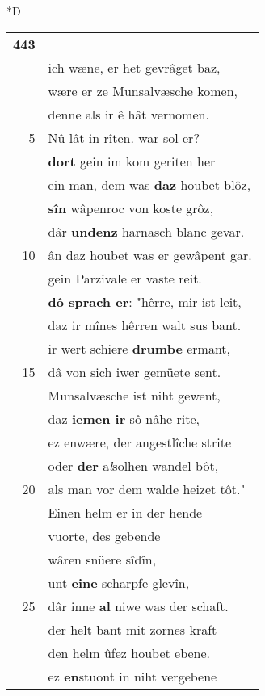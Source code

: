 \documentclass[8pt,a4paper,notitlepage]{article}
\begin{document}
\begin{table}[ht]
\begin{minipage}[t]{0.5\linewidth}
\small
\begin{center}*D
\end{center}
\begin{tabular}{rl}
\textbf{443} & \textit{\begin{large}A\end{large}}l sîner vröude er dô vergaz.\\ 
 & ich wæne, er het gevrâget baz,\\ 
 & wære er ze Munsalvæsche komen,\\ 
 & denne als ir ê hât vernomen.\\ 
5 & Nû lât in rîten. war sol er?\\ 
 & \textbf{dort} gein im kom geriten her\\ 
 & ein man, dem was \textbf{daz} houbet blôz,\\ 
 & \textbf{sîn} wâpenroc von koste grôz,\\ 
 & dâr \textbf{undenz} harnasch blanc gevar.\\ 
10 & ân daz houbet was er gewâpent gar.\\ 
 & gein Parzivale er vaste reit.\\ 
 & \textbf{dô sprach er}: "hêrre, mir ist leit,\\ 
 & daz ir mînes hêrren walt sus bant.\\ 
 & ir wert schiere \textbf{drumbe} ermant,\\ 
15 & dâ von sich iwer gemüete sent.\\ 
 & Munsalvæsche ist niht gewent,\\ 
 & daz \textbf{iemen ir} sô nâhe rite,\\ 
 & ez enwære, der angestlîche strite\\ 
 & oder \textbf{der} a\textit{l}solhen wandel bôt,\\ 
20 & als man vor dem walde heizet tôt."\\ 
 & Einen helm er in der hende\\ 
 & vuorte, des gebende\\ 
 & wâren snüere sîdîn,\\ 
 & unt \textbf{eine} scharpfe glevîn,\\ 
25 & dâr inne \textbf{al} niwe was der schaft.\\ 
 & der helt bant mit zornes kraft\\ 
 & den helm ûfez houbet ebene.\\ 
 & ez \textbf{en}stuont in niht vergebene\\ 

\end{tabular}
\end{minipage}
\end{table}
\end{document}
